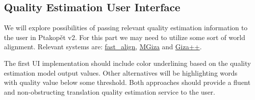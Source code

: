 \documentclass[a4paper]{article}
\begin{document}
\subsection{Quality Estimation User Interface}
We will explore possibilities of passing relevant quality estimation information to the user in Ptakopět v2. For this part we may need to utilize some sort of world alignment. Relevant systems are: \href{https://github.com/clab/fast_align}{fast\_align}, \href{https://github.com/moses-smt/mgiza}{MGiza} and \href{https://github.com/moses-smt/giza-pp}{Giza++}.

The first UI implementation should include color underlining based on the quality estimation model output values. Other alternatives will be highlighting words with quality value below some threshold. Both approaches should provide a fluent and non-obstructing translation quality estimation service to the user. 
\end{document}
